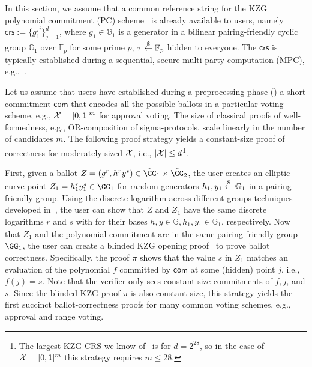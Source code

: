 In this section, we assume that a common reference string for the KZG polynomial commitment (PC) scheme~\cite{AC:KatZavGol10} is already available to users, namely $\mathsf{crs}:=\{g_1^{\tau^{j}}\}^{d}_{j=1}$, where $g_1\in\mathbb{G}_1$ is a generator in a bilinear pairing-friendly cyclic group $\mathbb{G}_1$ over $\mathbb{F}_p$ for some prime $p$, $\tau\stackrel{\$}{\gets}\mathbb{F}_p$ hidden to everyone. The $\mathsf{crs}$ is typically established during a sequential, secure multi-party computation (MPC), e.g.,~\cite{FCW:BowGabGre18}.



Let us assume that users have established during a preprocessing phase () a short commitment $\mathsf{com}$ that encodes all the possible ballots in a particular voting scheme, e.g., $\mathcal{X}= [0,1]^{m}$ for approval voting. The size of classical proofs of well-formedness, e.g., OR-composition of sigma-protocols, scale linearly in the number of candidates $m$. The following proof strategy yields a constant-size proof of correctness for moderately-sized $\mathcal{X}$, i.e., $\lvert \mathcal{X} \rvert \leq d$\footnote{The largest KZG CRS we know of~\cite{largekzg} is for $d = 2^{28}$, so in the case of $\mathcal{X} = [0,1]^m$ this strategy requires $m \leq 28$.}.

First, given a ballot $Z=(g^r,h^ry^s) \in \tilde{\GG}_1 \times \tilde{\GG}_2$, the user creates an elliptic curve point $Z_1=h^r_1y^s_1 \in \GG_1$ for random generators $h_1,y_1\stackrel{\$}{\gets}\mathbb{G}_1$ in a pairing-friendly group. Using the discrete logarithm across different groups techniques developed in~\cite{EPRINT:COPZ22}, the user can show that $Z$ and $Z_1$ have the same discrete logarithms $r$ and $s$ with for their bases $h,y\in\mathbb{G},h_1,y_1\in\mathbb{G}_1$, respectively. Now that $Z_1$ and the polynomial commitment are in the same pairing-friendly group $\GG_1$, the user can create a blinded KZG opening proof~\cite{CCS:ZBKMNS22} to prove ballot correctness. Specifically, the proof $\pi$ shows that the value $s$ in $Z_1$ matches an evaluation of the polynomial $f$ committed by $\mathsf{com}$ at some (hidden) point $j$, i.e., $f(j)=s$. Note that the verifier only sees constant-size commitments of $f,j$, and $s$. Since the blinded KZG proof $\pi$ is also constant-size, this strategy yields the first succinct ballot-correctness proofs for many common voting schemes, e.g., approval and range voting.

